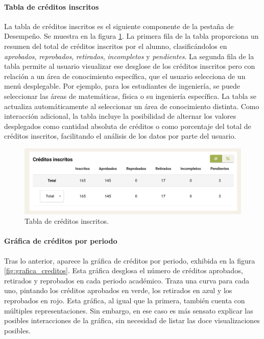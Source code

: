 \paragraph{Tabla de créditos inscritos} La tabla de créditos inscritos es el siguiente componente de la pestaña de Desempeño. Se muestra en la figura \ref{fig:tabla_creditos}. La primera fila de la tabla proporciona un resumen del total de créditos inscritos por el alumno, clasificándolos en \textit{aprobados}, \textit{reprobados}, \textit{retirados}, \textit{incompletos} y \textit{pendientes}. La segunda fila de la tabla permite al usuario visualizar ese desglose de los créditos inscritos pero con relación a un área de conocimiento específica, que el usuario selecciona de un menú desplegable. Por ejemplo, para los estudiantes de ingeniería, se puede seleccionar las áreas de matemáticas, física o su ingeniería específica. La tabla se actualiza automáticamente al seleccionar un área de conocimiento distinta. Como interacción adicional, la tabla incluye la posibilidad de alternar los valores desplegados como  cantidad absoluta de créditos o como porcentaje del total de créditos inscritos, facilitando el análisis de los datos por parte del usuario.

\begin{figure}[H]
	\includegraphics[width=\textwidth]{assets/nes/tabla_creditos.png}
	\caption{Tabla de créditos inscritos.}
	\label{fig:tabla_creditos}
\end{figure}

\paragraph{Gráfica de créditos por periodo} Tras lo anterior, aparece la gráfica de créditos por periodo, exhibida en la figura \ref{fig:grafica_creditos}. Esta gráfica desglosa el número de créditos aprobados, retirados y reprobados en cada periodo académico. Traza una curva para cada uno, pintando los créditos aprobados en verde, los retirados en azul y los reprobados en rojo. Esta gráfica, al igual que la primera, también cuenta con múltiples representaciones. Sin embargo, en ese caso es más sensato explicar las posibles interacciones de la gráfica, sin necesidad de listar las doce visualizaciones posibles.

